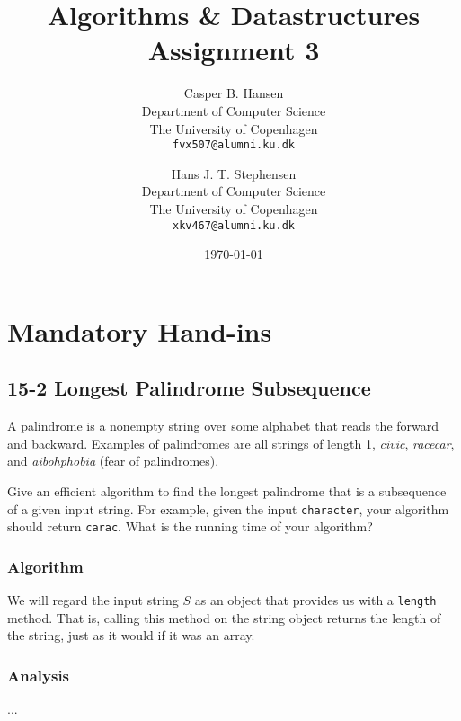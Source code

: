 \documentclass[11pt,english]{article}
\title
{
	\vspace{1in}
	Algorithms \& Datastructures\\
	\huge Assignment 3
}
\author
{
	Casper B. Hansen\\
	\small Department of Computer Science\\
	\small The University of Copenhagen\\
	\texttt{fvx507@alumni.ku.dk}
	\and
	Hans J. T. Stephensen\\
	\small Department of Computer Science\\
	\small The University of Copenhagen\\
	\texttt{xkv467@alumni.ku.dk}
}
\date{\today}
\begin{document}
\clearpage
\maketitle
\thispagestyle{empty}


\newpage
\pagestyle{fancy}

\section*{Mandatory Hand-ins}

\subsection*{15-2 Longest Palindrome Subsequence}
\large{A palindrome is a nonempty string over some alphabet that reads the
forward and backward. Examples of palindromes are all strings of length 1,
\textit{civic}, \textit{racecar}, and \textit{aibohphobia} (fear of
palindromes).

Give an efficient algorithm to find the longest palindrome that is a
subsequence of a given input string. For example, given the input
\texttt{character}, your algorithm should return \texttt{carac}. What is the
running time of your algorithm?}

\subsubsection*{Algorithm}
We will regard the input string $S$ as an object that provides us with a
\texttt{length} method. That is, calling this method on the string object
returns the length of the string, just as it would if it was an array.
\begin{algorithm}
	
	\BlankLine
	
\end{algorithm}

\subsubsection*{Analysis}
...







\end{document}
